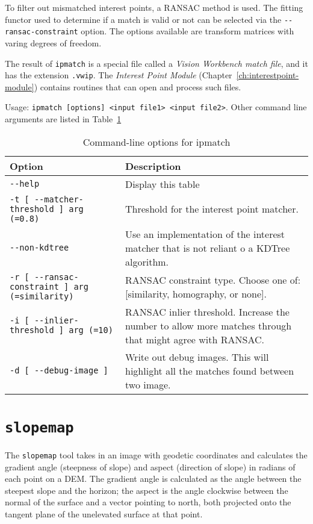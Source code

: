 To filter out mismatched interest points, a RANSAC method is used. The fitting functor used to determine if a match is valid or not can be selected via the \verb#--ransac-constraint# option. The options available are transform matrices with varing degrees of freedom.

The result of \verb#ipmatch# is a special file called a \emph{Vision Workbench match file}, and it has the extension \verb#.vwip#. The \emph{Interest Point Module} (Chapter~\ref{ch:interestpoint-module}) contains routines that can open and process such files.

Usage: \verb#ipmatch [options] <input file1> <input file2>#. Other command line arguments are listed in Table~\ref{tbl:ipmatch}

\begin{longtable}{|l|p{9cm}|}
\caption{Command-line options for ipmatch}
\label{tbl:ipmatch}
\endfirsthead
\endhead
\endfoot
\endlastfoot
\hline
Option & Description \\ \hline \hline
\verb#--help# & Display this table\\ \hline
\verb#-t [ --matcher-threshold ] arg (=0.8)# & Threshold for the interest point matcher.\\ \hline
\verb#--non-kdtree# & Use an implementation of the interest matcher that is not reliant o a KDTree algorithm.\\ \hline
\verb#-r [ --ransac-constraint ] arg (=similarity)# & RANSAC constraint type. Choose one of: [similarity, homography, or none].\\ \hline
\verb#-i [ --inlier-threshold ] arg (=10)# & RANSAC inlier threshold. Increase the number to allow more matches through that might agree with RANSAC.\\ \hline
\verb#-d [ --debug-image ]# & Write out debug images. This will highlight all the matches found between two image.\\ \hline
\end{longtable}


\section{{\tt slopemap}}\label{sec:slopemap} %
The \verb#slopemap# tool takes in an image with geodetic coordinates and calculates the gradient angle (steepness of slope) and aspect (direction of slope) in radians of each point on a DEM. The gradient angle is calculated as the angle between the steepest slope and the horizon; the aspect is the angle clockwise between the normal of the surface and a vector pointing to north, both projected onto the tangent plane of the unelevated surface at that point. 

